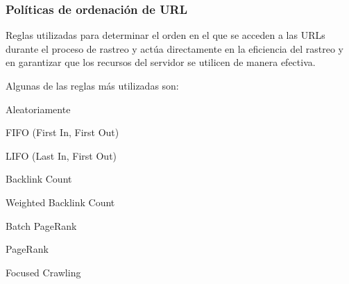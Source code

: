 \documentclass[
10pt, %
aspectratio=169, %
]{beamer}
\begin{document}
	\begin{frame}
		
		\frametitle{Políticas de ordenación de URL}
		
		Reglas utilizadas para determinar el orden en el que se acceden a las URLs durante el proceso de rastreo y actúa directamente en la eficiencia del rastreo y en garantizar que los recursos del servidor se utilicen de manera efectiva.
		
		\vspace{\baselineskip}
		
		Algunas de las reglas más utilizadas son:
		\begin{itemize}
			
			\begin{minipage}[t]{0.43\textwidth} %
				
				\item Aleatoriamente
				
				\item FIFO (First In, First Out)
				
				\item LIFO (Last In, First Out)
				
				\item Backlink Count
	
			\end{minipage}
			\hfill  %
			\begin{minipage}[t]{0.43\textwidth} %
				
				\item Weighted Backlink Count
				
				\item Batch PageRank
				
				\item PageRank
				
				\item Focused Crawling
				
			\end{minipage}
			
		\end{itemize}
				
	\end{frame}
		
\end{document}
